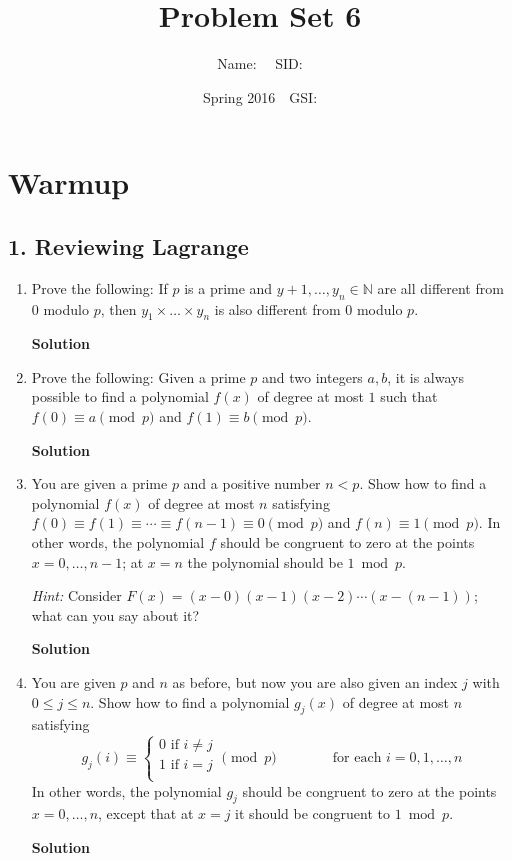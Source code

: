 \documentclass{article}\usepackage{amsmath,amssymb,amsthm,tikz,tkz-graph,color,chngpage,soul,hyperref,csquotes,graphicx,floatrow}\newcommand*{\QEDB}{\hfill\ensuremath{\square}}\newtheorem*{prop}{Proposition}\renewcommand{\theenumi}{\alph{enumi}}\usepackage[shortlabels]{enumitem}\usepackage[nobreak=true]{mdframed}\usetikzlibrary{matrix,calc}\MakeOuterQuote{"}\usepackage[margin=0.75in]{geometry} \newtheorem{theorem}{Theorem}
\title{Problem Set 6}
\author{Name: $\quad$SID: }
\date{Spring 2016$\quad$GSI: }
\begin{document}
\maketitle

\section*{Warmup}

\subsection*{1. Reviewing Lagrange}
\begin{enumerate}
\item Prove the following: If $p$ is a prime and $y+1,\ldots,y_n\in \mathbb{N}$ are all different from $0$ modulo $p$, then $y_1\times \ldots\times y_n$ is also different from $0$ modulo $p$.
\begin{mdframed}
\textbf{Solution}

\end{mdframed}
\item Prove the following: Given a prime $p$ and two integers $a,b$, it is always possible to find a polynomial $f(x)$ of degree at most $1$ such that $f(0)\equiv a\pmod p$ and $f(1)\equiv b\pmod p$.
\begin{mdframed}
\textbf{Solution}

\end{mdframed}
\item You are given a prime $p$ and a positive number $n<p$. Show how to find a polynomial $f(x)$ of degree at most $n$ satisfying $f(0)\equiv f(1)\equiv \cdots\equiv f(n-1)\equiv 0\pmod p$ and $f(n)\equiv 1\pmod p$. In other words, the polynomial $f$ should be congruent to zero at the points $x=0,\ldots,n-1$; at $x=n$ the polynomial should be $1\bmod p$.

\textit{Hint:} Consider $F(x)=(x-0)(x-1)(x-2)\cdots(x-(n-1))$; what can you say about it?
\begin{mdframed}
\textbf{Solution}

\end{mdframed}
\item You are given $p$ and $n$ as before, but now you are also given an index $j$ with $0\leqslant j\leqslant n$. Show how to find a polynomial $g_j(x)$ of degree at most $n$ satisfying $$g_j(i)\equiv \begin{cases}0 \text{ if } i\ne j \\ 1 \text{ if } i= j \\ \end{cases}\pmod p \quad\quad\quad\quad \text{for each } i=0,1,\ldots,n$$ In other words, the polynomial $g_j$ should be congruent to zero at the points $x=0,\ldots,n$, except that at $x=j$ it should be congruent to $1\bmod p$.
\begin{mdframed}
\textbf{Solution}


\end{mdframed}
\end{enumerate}
\end{document}
